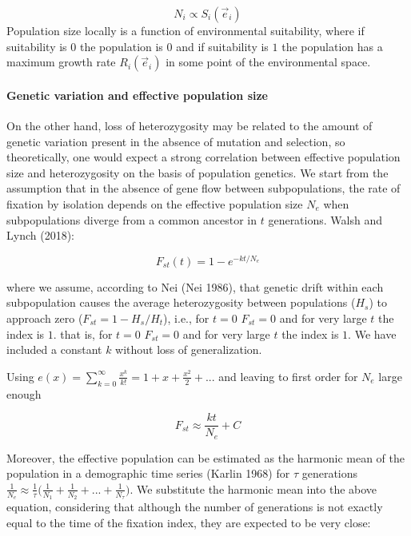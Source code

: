 \documentclass[
]{article}
\begin{document}
\[
N_i \propto  S_i(\vec{e}_i)
\] Population size locally is a function of environmental suitability,
where if suitability is \(0\) the population is \(0\) and if suitability
is \(1\) the population has a maximum growth rate \(R_i(\vec{e}_i)\) in
some point of the environmental space.

\hypertarget{genetic-variation-and-effective-population-size}{%
\paragraph{Genetic variation and effective population
size}\label{genetic-variation-and-effective-population-size}}

On the other hand, loss of heterozygosity may be related to the amount
of genetic variation present in the absence of mutation and selection,
so theoretically, one would expect a strong correlation between
effective population size and heterozygosity on the basis of population
genetics. We start from the assumption that in the absence of gene flow
between subpopulations, the rate of fixation by isolation depends on the
effective population size \(N_e\) when subpopulations diverge from a
common ancestor in \(t\) generations. Walsh and Lynch (2018):

\[
F_{st}(t) = 1 - e^{-kt/N_e } 
\]

where we assume, according to Nei (Nei 1986), that genetic drift within
each subpopulation causes the average heterozygosity between populations
(\(H_s\)) to approach zero (\(F_{st} = 1 - H_s/H_t\)), i.e., for \(t=0\)
\(F_{st} = 0\) and for very large \(t\) the index is \(1\). that is, for
\(t=0\) \(F_{st} = 0\) and for very large \(t\) the index is \(1\). We
have included a constant \(k\) without loss of generalization.

Using
\(e(x) = \sum_{k=0}^{\infty} \frac{x^k}{k!} = 1 + x + \frac{x^2}{2} + ...\)
and leaving to first order for \(N_e\) large enough

\[
F_{st} \approx \frac{kt}{N_e} + C
\]

Moreover, the effective population can be estimated as the harmonic mean
of the population in a demographic time series (Karlin 1968) for
\(\tau\) generations
\(\frac{1}{N_e} \approx \frac{1}{\tau}\Big({\frac{1}{N_1} + \frac{1}{N_2} + ... + \frac{1}{N_\tau} } \Big)\).
We substitute the harmonic mean into the above equation, considering
that although the number of generations is not exactly equal to the time
of the fixation index, they are expected to be very close:
\end{document}
